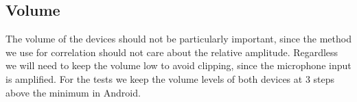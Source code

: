 \subsection{Volume}
The volume of the devices should not be particularly important, since
the method we use for correlation should not care about the relative
amplitude. Regardless we will need to keep the volume low to avoid
clipping, since the microphone input is amplified. For the tests we keep
the volume levels of both devices at 3 steps above the minimum in
Android.

